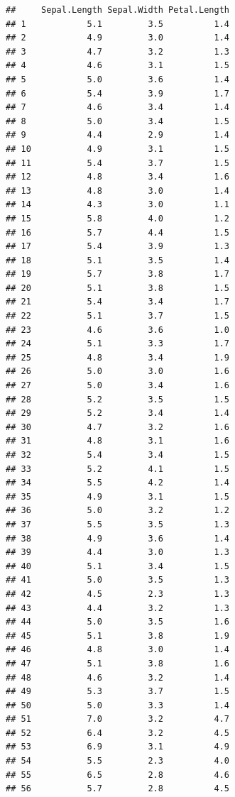 \documentclass[
]{book}
\begin{document}
\begin{verbatim}
##     Sepal.Length Sepal.Width Petal.Length
## 1            5.1         3.5          1.4
## 2            4.9         3.0          1.4
## 3            4.7         3.2          1.3
## 4            4.6         3.1          1.5
## 5            5.0         3.6          1.4
## 6            5.4         3.9          1.7
## 7            4.6         3.4          1.4
## 8            5.0         3.4          1.5
## 9            4.4         2.9          1.4
## 10           4.9         3.1          1.5
## 11           5.4         3.7          1.5
## 12           4.8         3.4          1.6
## 13           4.8         3.0          1.4
## 14           4.3         3.0          1.1
## 15           5.8         4.0          1.2
## 16           5.7         4.4          1.5
## 17           5.4         3.9          1.3
## 18           5.1         3.5          1.4
## 19           5.7         3.8          1.7
## 20           5.1         3.8          1.5
## 21           5.4         3.4          1.7
## 22           5.1         3.7          1.5
## 23           4.6         3.6          1.0
## 24           5.1         3.3          1.7
## 25           4.8         3.4          1.9
## 26           5.0         3.0          1.6
## 27           5.0         3.4          1.6
## 28           5.2         3.5          1.5
## 29           5.2         3.4          1.4
## 30           4.7         3.2          1.6
## 31           4.8         3.1          1.6
## 32           5.4         3.4          1.5
## 33           5.2         4.1          1.5
## 34           5.5         4.2          1.4
## 35           4.9         3.1          1.5
## 36           5.0         3.2          1.2
## 37           5.5         3.5          1.3
## 38           4.9         3.6          1.4
## 39           4.4         3.0          1.3
## 40           5.1         3.4          1.5
## 41           5.0         3.5          1.3
## 42           4.5         2.3          1.3
## 43           4.4         3.2          1.3
## 44           5.0         3.5          1.6
## 45           5.1         3.8          1.9
## 46           4.8         3.0          1.4
## 47           5.1         3.8          1.6
## 48           4.6         3.2          1.4
## 49           5.3         3.7          1.5
## 50           5.0         3.3          1.4
## 51           7.0         3.2          4.7
## 52           6.4         3.2          4.5
## 53           6.9         3.1          4.9
## 54           5.5         2.3          4.0
## 55           6.5         2.8          4.6
## 56           5.7         2.8          4.5

\end{verbatim}
\end{document}
